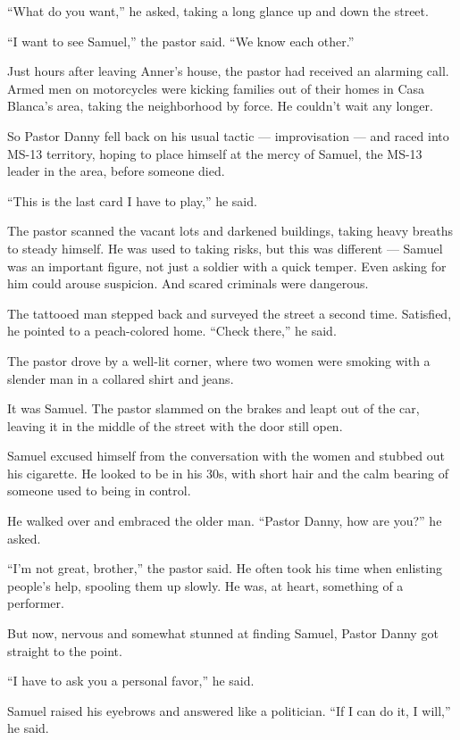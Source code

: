 ``What do you want,'' he asked, taking a long glance up and down the
street.

``I want to see Samuel,'' the pastor said. ``We know each other.''

Just hours after leaving Anner's house, the pastor had received an
alarming call. Armed men on motorcycles were kicking families out of
their homes in Casa Blanca's area, taking the neighborhood by force. He
couldn't wait any longer.

So Pastor Danny fell back on his usual tactic --- improvisation --- and
raced into MS-13 territory, hoping to place himself at the mercy of
Samuel, the MS-13 leader in the area, before someone died.

``This is the last card I have to play,'' he said.

The pastor scanned the vacant lots and darkened buildings, taking heavy
breaths to steady himself. He was used to taking risks, but this was
different --- Samuel was an important figure, not just a soldier with a
quick temper. Even asking for him could arouse suspicion. And scared
criminals were dangerous.

The tattooed man stepped back and surveyed the street a second time.
Satisfied, he pointed to a peach-colored home. ``Check there,'' he said.

The pastor drove by a well-lit corner, where two women were smoking with
a slender man in a collared shirt and jeans.

It was Samuel. The pastor slammed on the brakes and leapt out of the
car, leaving it in the middle of the street with the door still open.

Samuel excused himself from the conversation with the women and stubbed
out his cigarette. He looked to be in his 30s, with short hair and the
calm bearing of someone used to being in control.

He walked over and embraced the older man. ``Pastor Danny, how are
you?'' he asked.

``I'm not great, brother,'' the pastor said. He often took his time when
enlisting people's help, spooling them up slowly. He was, at heart,
something of a performer.

But now, nervous and somewhat stunned at finding Samuel, Pastor Danny
got straight to the point.

``I have to ask you a personal favor,'' he said.

Samuel raised his eyebrows and answered like a politician. ``If I can do
it, I will,'' he said.

